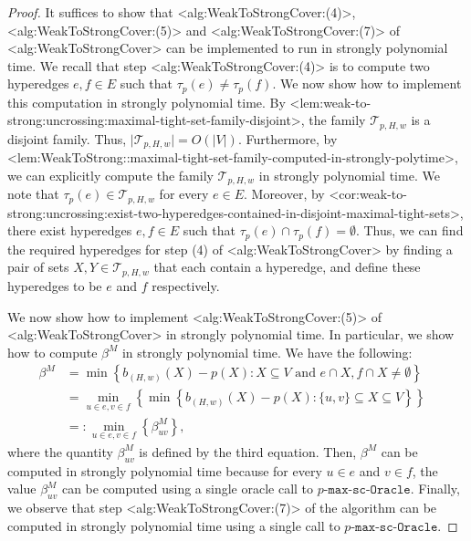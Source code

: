 \documentclass{article}
\def\Cref#1{<#1>}%
\newcommand{\functionMaximizationOracleStrongCover}[1]{\ensuremath{{#1}\text{-}\mathtt{max}\text{-}\mathtt{sc}\text{-}\mathtt{Oracle}}\xspace}
\newcommand{\maximalTightSetFamily}[1]{\ensuremath{\calT_{#1}}\xspace}
\newcommand{\maximalTightSetContainingHyperedge}[1]{\ensuremath{\tau_{#1}}\xspace}
\providecommand{\calT}{\mathcal{T}}
\begin{document}
  \begin{proof}
  It suffices to show that  \Cref{alg:WeakToStrongCover:(4)}, \Cref{alg:WeakToStrongCover:(5)} and \Cref{alg:WeakToStrongCover:(7)} of \Cref{alg:WeakToStrongCover} can be implemented to run in strongly polynomial time.
  We recall that step \Cref{alg:WeakToStrongCover:(4)} is to compute two hyperedges $e, f \in E$ such that $\maximalTightSetContainingHyperedge{p}(e) \not = \maximalTightSetContainingHyperedge{p}(f)$. We now show how to implement this computation in strongly polynomial time.  By \Cref{lem:weak-to-strong:uncrossing:maximal-tight-set-family-disjoint}, the family $\maximalTightSetFamily{p, H, w}$ is a disjoint family. Thus, $|$\maximalTightSetFamily{p, H, w}$| = O(|V|)$. Furthermore,  by \Cref{lem:WeakToStrong::maximal-tight-set-family-computed-in-strongly-polytime}, we can explicitly compute the family $\maximalTightSetFamily{p, H, w}$ in strongly polynomial time. We note that $\maximalTightSetContainingHyperedge{p}(e) \in \maximalTightSetFamily{p, H, w}$ for every $e \in E$.
      Moreover, by \Cref{cor:weak-to-strong:uncrossing:exist-two-hyperedges-contained-in-disjoint-maximal-tight-sets}, there exist hyperedges $e, f \in E$ such that $\maximalTightSetContainingHyperedge{p}(e) \cap \maximalTightSetContainingHyperedge{p}(f) = \emptyset$. Thus, we can find the required hyperedges for step (4) of \Cref{alg:WeakToStrongCover} by finding a pair of sets $X, Y \in \maximalTightSetFamily{p, H, w}$ that each contain a hyperedge, and define these hyperedges to be $e$ and $f$ respectively.

      We now show how to implement \Cref{alg:WeakToStrongCover:(5)} of \Cref{alg:WeakToStrongCover} in strongly polynomial time. In particular, we show how to compute $\beta^M$ in strongly polynomial time.
We have the following:
\begin{align*}
    \beta^M& = \min\left\{b_{(H,w)}(X) - p(X) : X \subseteq V \text{ and } e \cap X, f \cap X \not = \emptyset\right\} &\\
    & = \min_{u \in e, v \in f}\left\{\min\left\{b_{(H,w)}(X) - p(X) : \{u,v\} \subseteq X \subseteq V\right\}\right\}&\\
    &=: \min_{u \in e, v \in f}\left\{\beta^M_{uv}\right\},&
\end{align*}
where the quantity $\beta^M_{uv}$ is defined by the third equation. Then, $\beta^M$ can be computed in strongly polynomial time because  for every $u \in e$ and $v \in f$, the value $\beta^M_{uv}$ can be computed using a single oracle call to \functionMaximizationOracleStrongCover{p}. Finally, we observe that step \Cref{alg:WeakToStrongCover:(7)} of the algorithm can be computed in strongly polynomial time using a single call to $\functionMaximizationOracleStrongCover{p}$.
  \end{proof}
\end{document}
